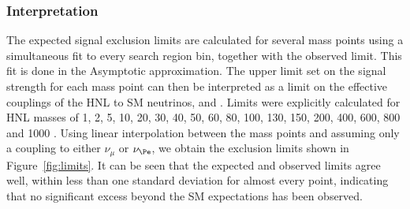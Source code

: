 \subsubsection{Interpretation}
 The expected signal exclusion limits are calculated for
 several mass points using a simultaneous fit to every search region
 bin, together with the observed limit. This fit is done in the
 Asymptotic approximation. The upper limit set on the signal strength
 for each mass point can then be interpreted as a
 limit on the effective couplings of the HNL to SM neutrinos, \mixpare
 and \mixparm. Limits were explicitly calculated for HNL masses of 1, 2, 5, 10, 20, 30, 40, 50, 60, 80, 100,
 130, 150, 200, 400, 600, 800 and 1000 \GeV. Using linear
 interpolation between the mass points and assuming only a coupling to either $\nu_{\mu}$ or $\nu_{\Pe}$,
 we obtain the exclusion limits shown in Figure~\ref{fig:limits}. It can be seen that the expected and
 observed limits agree well, within less than one standard deviation
 for almost every point, indicating that no significant excess beyond
 the SM expectations has been observed. 
